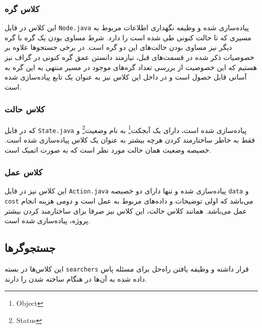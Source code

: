 	\subsubsection{کلاس گره}
	این کلاس در فایل
	\texttt{Node.java}
	پیاده‌سازی شده و وظیفه نگهداری اطلاعات مربوط به مسیری که تا حالت کنونی طی شده است را دارد. شرط مساوی بودن یک گره با گره دیگر نیز مساوی بودن حالت‌های این دو گره است. در برخی جستجوها علاوه بر خصوصیات ذکر شده در قسمت‌های قبل، نیازمند دانستن عمق گره کنونی در گراف نیز هستیم که این خصوصیت از بررسی تعداد گره‌های موجود در مسیر منتهی به این گره به آسانی قابل حصول است و در داخل این کلاس نیز به عنوان یک تابع پیاده‌سازی شده است.
	\subsubsection{کلاس حالت}
	که در فایل
	\texttt{State.java}
	پیاده‌سازی شده است، دارای یک آبجکت\footnote{Object} به نام وضعیت\footnote{Status} و فقط به خاطر ساختارمند کردن هرچه بیشتر به عنوان یک کلاس پیاده‌سازی شده است. خصیصه وضعیت همان حالت مورد نظر است که به صورت اتمیک است.
	\subsubsection{کلاس عمل}
	این کلاس نیز در فایل
	\texttt{Action.java}
	پیاده‌سازی شده و تنها دارای دو خصیصه
	\texttt{data}
	و
	\texttt{cost}
	می‌باشد که اولی توضیحات و داده‌های مربوط به عمل است و دومی هزینه انجام عمل می‌باشد. همانند کلاس حالت، این کلاس نیز صرفا برای ساختارمند کردن بیشتر پروژه، پیاده‌سازی شده است.
	\subsection{جستجوگرها}
	این کلاس‌ها در بسته
	\texttt{searchers}
	قرار داشته و وظیفه یافتن راه‌حل برای مسئله پاس داده شده به آن‌ها در هنگام ساخته شدن را دارند. 
